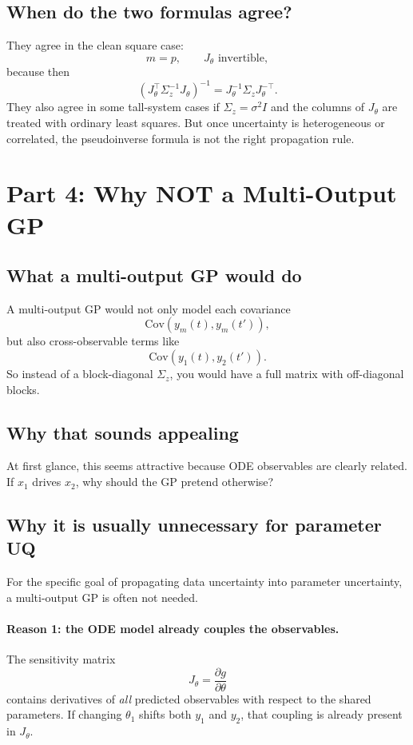 \documentclass[11pt]{article}
\begin{document}
\subsection*{When do the two formulas agree?}
They agree in the clean square case:
\[
m=p,\qquad J_\theta \text{ invertible},
\]
because then
\[
(J_\theta^\top \Sigma_z^{-1}J_\theta)^{-1}
=
J_\theta^{-1}\Sigma_z J_\theta^{-\top}.
\]
They also agree in some tall-system cases if $\Sigma_z = \sigma^2 I$ and the columns of $J_\theta$ are treated with ordinary least squares. But once uncertainty is heterogeneous or correlated, the pseudoinverse formula is not the right propagation rule.

\section{Part 4: Why NOT a Multi-Output GP}

\subsection*{What a multi-output GP would do}
A multi-output GP would not only model each covariance
\[
\mathrm{Cov}(y_m(t),y_m(t')),
\]
but also cross-observable terms like
\[
\mathrm{Cov}(y_1(t),y_2(t')).
\]
So instead of a block-diagonal $\Sigma_z$, you would have a full matrix with off-diagonal blocks.

\subsection*{Why that sounds appealing}
At first glance, this seems attractive because ODE observables are clearly related. If $x_1$ drives $x_2$, why should the GP pretend otherwise?

\subsection*{Why it is usually unnecessary for parameter UQ}
For the specific goal of propagating data uncertainty into parameter uncertainty, a multi-output GP is often not needed.

\paragraph{Reason 1: the ODE model already couples the observables.}
The sensitivity matrix
\[
J_\theta = \frac{\partial g}{\partial \theta}
\]
contains derivatives of \emph{all} predicted observables with respect to the shared parameters. If changing $\theta_1$ shifts both $y_1$ and $y_2$, that coupling is already present in $J_\theta$.
\end{document}
